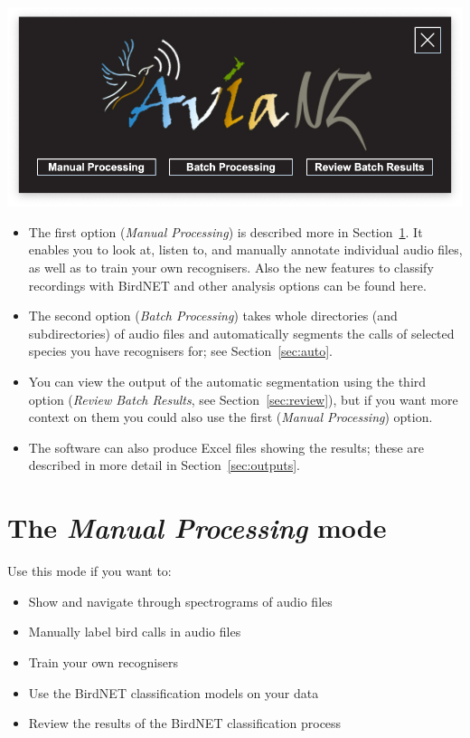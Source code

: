 \documentclass{scrartcl}
\begin{document}
\begin{center}
\includegraphics[width=.6\textwidth]{Figures/Splashscreen}
\end{center}

\begin{itemize}
	\item The first option (\textit{Manual Processing}) is described more in Section~\ref{sec:manual}. It enables you to look at, listen to, and manually annotate individual audio files, as well as to train your own recognisers.
		Also the new features to classify recordings with BirdNET and other analysis options can be found here.
	\item The second option (\textit{Batch Processing}) takes whole directories (and subdirectories) of audio files and automatically segments the calls of selected species you have recognisers for; see Section~\ref{sec:auto}. 
	\item You can view the output of the automatic segmentation using the third option (\textit{Review Batch Results}, see Section~\ref{sec:review}), but if you want more context on them you could also use the first (\textit{Manual Processing}) option. 
	\item The software can also produce Excel files showing the results; these are described in more detail in Section~\ref{sec:outputs}. 
\end{itemize}

\newpage
\section{The \textit{Manual Processing} mode}\label{sec:manual}
Use this mode if you want to:
\begin{itemize}
	\item Show and navigate through spectrograms of audio files
	\item Manually label bird calls in audio files
	\item Train your own recognisers
	\item Use the BirdNET classification models on your data
	\item Review the results of the BirdNET classification process
\end{itemize}
\end{document}
